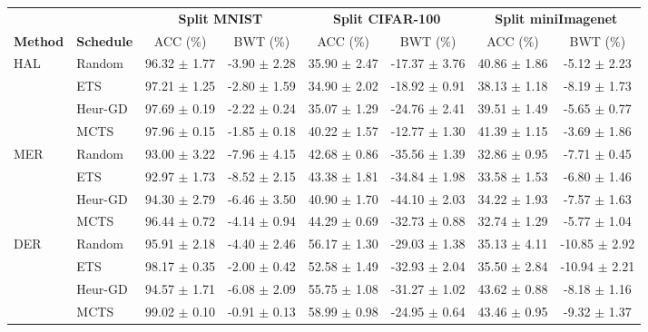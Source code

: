 \begin{tabular}{llcccccc}
	\toprule
	&                   & \multicolumn{2}{c}{\textbf{Split MNIST}} & \multicolumn{2}{c}{\textbf{Split CIFAR-100}} & \multicolumn{2}{c}{\textbf{Split miniImagenet}} \\
	\cmidrule(lr){3-4} \cmidrule(lr){5-6} \cmidrule(lr){7-8}
	\textbf{Method}      & \textbf{Schedule} & ACC (\%)            & BWT (\%)           & ACC (\%)             & BWT (\%)              & ACC (\%)               & BWT (\%)               \\ \midrule
	\multirow{4}{*}{HAL} & Random            & 96.32 $\pm$ 1.77      & -3.90 $\pm$ 2.28     & 35.90 $\pm$ 2.47       & -17.37 $\pm$ 3.76       & 40.86 $\pm$ 1.86         & -5.12 $\pm$ 2.23         \\
	& ETS               & 97.21 $\pm$ 1.25      & -2.80 $\pm$ 1.59     & 34.90 $\pm$ 2.02       & -18.92 $\pm$ 0.91       & 38.13 $\pm$ 1.18         & -8.19 $\pm$ 1.73         \\
	& Heur-GD           & 97.69 $\pm$ 0.19      & -2.22 $\pm$ 0.24     & 35.07 $\pm$ 1.29       & -24.76 $\pm$ 2.41       & 39.51 $\pm$ 1.49         & -5.65 $\pm$ 0.77         \\
	& MCTS              & 97.96 $\pm$ 0.15      & -1.85 $\pm$ 0.18     & 40.22 $\pm$ 1.57       & -12.77 $\pm$ 1.30       & 41.39 $\pm$ 1.15         & -3.69 $\pm$ 1.86         \\ \midrule
	\multirow{4}{*}{MER} & Random            & 93.00 $\pm$ 3.22      & -7.96 $\pm$ 4.15     & 42.68 $\pm$ 0.86       & -35.56 $\pm$ 1.39       & 32.86 $\pm$ 0.95         & -7.71 $\pm$ 0.45         \\
	& ETS               & 92.97 $\pm$ 1.73      & -8.52 $\pm$ 2.15     & 43.38 $\pm$ 1.81       & -34.84 $\pm$ 1.98       & 33.58 $\pm$ 1.53         & -6.80 $\pm$ 1.46         \\
	& Heur-GD           & 94.30 $\pm$ 2.79      & -6.46 $\pm$ 3.50     & 40.90 $\pm$ 1.70       & -44.10 $\pm$ 2.03       & 34.22 $\pm$ 1.93         & -7.57 $\pm$ 1.63         \\
	& MCTS              & 96.44 $\pm$ 0.72      & -4.14 $\pm$ 0.94     & 44.29 $\pm$ 0.69       & -32.73 $\pm$ 0.88       & 32.74 $\pm$ 1.29         & -5.77 $\pm$ 1.04         \\ \midrule
	\multirow{4}{*}{DER} & Random            & 95.91 $\pm$ 2.18      & -4.40 $\pm$ 2.46     & 56.17 $\pm$ 1.30       & -29.03 $\pm$ 1.38       & 35.13 $\pm$ 4.11         & -10.85 $\pm$ 2.92        \\
	& ETS               & 98.17 $\pm$ 0.35      & -2.00 $\pm$ 0.42     & 52.58 $\pm$ 1.49       & -32.93 $\pm$ 2.04       & 35.50 $\pm$ 2.84         & -10.94 $\pm$ 2.21        \\
	& Heur-GD           & 94.57 $\pm$ 1.71      & -6.08 $\pm$ 2.09     & 55.75 $\pm$ 1.08       & -31.27 $\pm$ 1.02       & 43.62 $\pm$ 0.88         & -8.18 $\pm$ 1.16         \\
	& MCTS              & 99.02 $\pm$ 0.10      & -0.91 $\pm$ 0.13     & 58.99 $\pm$ 0.98       & -24.95 $\pm$ 0.64       & 43.46 $\pm$ 0.95         & -9.32 $\pm$ 1.37    \\ 
	\bottomrule
\end{tabular}
